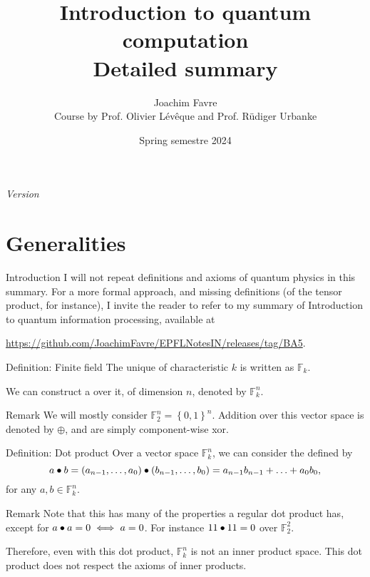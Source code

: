 \documentclass[a4paper]{article}
\title{Introduction to quantum computation \\ Detailed summary}
\author{Joachim Favre \\ Course by Prof. Olivier Lévêque and Prof. Rüdiger Urbanke}
\date{Spring semestre 2024}
\begin{document}
\maketitle

\setcounter{tocdepth}{5}

\tableofcontents

\initcurrdate
\def\setdateformat{Y--m--d}
\vspace*{\fill}
\begin{center}
    \textit{Version \printdate}
\end{center}
\vspace*{\fill}
\vspace*{\fill}
\newpage

\section{Generalities}

\begin{parag}{Introduction}
    I will not repeat definitions and axioms of quantum physics in this summary. For a more formal approach, and missing definitions (of the tensor product, for instance), I invite the reader to refer to my summary of Introduction to quantum information processing, available at
    \begin{center}
        \url{https://github.com/JoachimFavre/EPFLNotesIN/releases/tag/BA5}.
    \end{center}
\end{parag}

\begin{parag}{Definition: Finite field}
    The unique  of characteristic $k$ is written as $\mathbb{F}_{k}$.

    We can construct a  over it, of dimension $n$, denoted by $\mathbb{F}_k^n$.

    \begin{subparag}{Remark}
        We will mostly consider $\mathbb{F}_{2}^n = \left\{0, 1\right\}^n$. Addition over this vector space is denoted by $\oplus$, and are simply component-wise xor.
    \end{subparag}
\end{parag}

\begin{parag}{Definition: Dot product}
    Over a vector space $\mathbb{F}_k^n$, we can consider the  defined by
    \[a \dotprod b = \left(a_{n-1}, \ldots, a_{0}\right) \dotprod \left(b_{n-1}, \ldots, b_0\right) = a_{n-1} b_{n-1} + \ldots + a_0 b_0,\]
    for any $a, b \in \mathbb{F}_{k}^n$.

    \begin{subparag}{Remark}
        Note that this has many of the properties a regular dot product has, except for $a \bullet a = 0 \iff a = 0$. For instance $11 \bullet 11 = 0$ over $\mathbb{F}_2^2$. 

        Therefore, even with this dot product, $\mathbb{F}_k^n$ is not an inner product space. This dot product does not respect the axioms of inner products.
    \end{subparag}
\end{parag}
\end{document}
